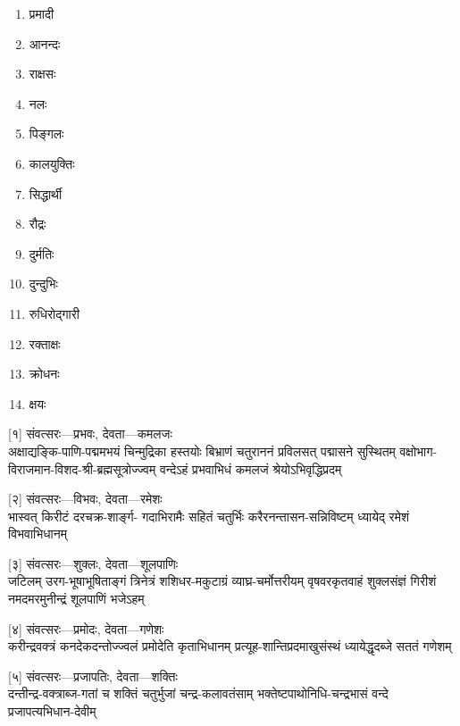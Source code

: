 \begin{multicols}{2}
\begin{enumerate}
\item प्रमादी 
\item आनन्दः 
\item राक्षसः 
\item नलः 
\item पिङ्गलः 
\item कालयुक्तिः 
\item सिद्धार्थी 
\item रौद्रः 
\item दुर्मतिः 
\item दुन्दुभिः 
\item रुधिरोद्गारी 
\item रक्ताक्षः 
\item क्रोधनः 
\item क्षयः
\end{enumerate}
\end{multicols}


[१] संवत्सरः—प्रभवः, देवता—कमलजः\\

\fourlineindentedshloka
{अक्षाद्यङ्कि-पाणि-पद्ममभयं चिन्मुद्रिका हस्तयोः}
{बिभ्राणं चतुराननं प्रविलसत् पद्मासने सुस्थितम्}
{वक्षोभाग-विराजमान-विशद-श्री-ब्रह्मसूत्रोज्ज्वम्}
{वन्देऽहं प्रभवाभिधं कमलजं श्रेयोऽभिवृद्धिप्रदम्}

[२] संवत्सरः—विभवः, देवता—रमेशः\\

\fourlineindentedshloka
{भास्वत् किरीटं दरचक्र-शार्ङ्ग-}
{गदाभिरामैः सहितं चतुर्भिः}
{करैरनन्तासन-सन्निविष्टम्}
{ध्यायेद् रमेशं विभवाभिधानम्}

[३] संवत्सरः—शुक्लः, देवता—शूलपाणिः\\

\fourlineindentedshloka
{जटिलम् उरग-भूषाभूषिताङ्गं त्रिनेत्रं}
{शशिधर-मकुटाग्रं व्याघ्र-चर्मोत्तरीयम्}
{वृषवरकृतवाहं शुक्लसंज्ञं गिरीशं}
{नमदमरमुनीन्द्रं शूलपाणिं भजेऽहम्}

[४] संवत्सरः—प्रमोदः, देवता—गणेशः\\

\twolineshloka
{करीन्द्रवक्त्रं कनदेकदन्तोज्ज्वलं प्रमोदेति कृताभिधानम्}
{प्रत्यूह-शान्तिप्रदमाखुसंस्थं ध्यायेद्धृदब्जे सततं गणेशम्} %

[५] संवत्सरः—प्रजापतिः, देवता—शक्तिः\\

\fourlineindentedshloka
{दन्तीन्द्र-वक्त्राब्ज-गतां च शक्तिं}
{चतुर्भुजां चन्द्र-कलावतंसाम्}
{भक्तेष्टपाथोनिधि-चन्द्रभासं}
{वन्दे प्रजापत्यभिधान-देवीम्}

